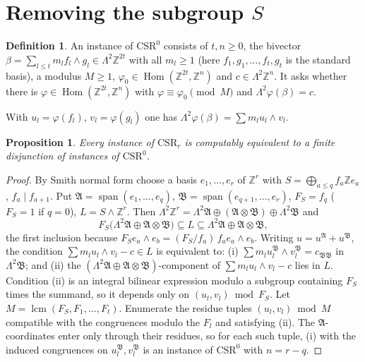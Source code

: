 \documentclass[11pt]{amsart}
\newtheorem{proposition}[theorem]{Proposition}
\theoremstyle{definition}
\newtheorem{definition}[theorem]{Definition}
\theoremstyle{remark}
\newcommand{\Z}{\mathbb{Z}}
\newcommand{\w}{\wedge}
\newcommand{\Hom}{\operatorname{Hom}}
\newcommand{\lcm}{\operatorname{lcm}}
\newcommand{\spn}{\operatorname{span}}
\begin{document}
\section{Removing the subgroup \texorpdfstring{$S$}{S}}\label{sec:S}

\begin{definition}
An instance of $\mathrm{CSR}^0$ consists of $t,n\ge0$, the bivector
$\beta=\sum_{l\le t}m_l f_l\w g_l\in\Lambda^2\Z^{2t}$ with all $m_l\ge1$ (here
$f_1,g_1,\dots,f_t,g_t$ is the standard basis), a modulus $M\ge1$,
$\varphi_0\in\Hom(\Z^{2t},\Z^n)$ and $c\in\Lambda^2\Z^n$. It asks whether there is
$\varphi\in\Hom(\Z^{2t},\Z^n)$ with $\varphi\equiv\varphi_0\pmod M$ and
$\Lambda^2\varphi(\beta)=c$.
\end{definition}

With $u_l=\varphi(f_l)$, $v_l=\varphi(g_l)$ one has
$\Lambda^2\varphi(\beta)=\sum m_lu_l\w v_l$.

\begin{proposition}\label{prop:removeS}
Every instance of $\mathrm{CSR}_r$ is computably equivalent to a finite disjunction
of instances of $\mathrm{CSR}^0$.
\end{proposition}

\begin{proof}
By Smith normal form choose a basis $e_1,\dots,e_r$ of $\Z^r$ with
$S=\bigoplus_{a\le q}f_a\Z e_a$, $f_a\mid f_{a+1}$. Put
$\mathfrak A=\spn(e_1,\dots,e_q)$, $\mathfrak B=\spn(e_{q+1},\dots,e_r)$, $F_S=f_q$
($F_S=1$ if $q=0$), $L=S\w\Z^r$. Then
$\Lambda^2\Z^r=\Lambda^2\mathfrak A\oplus(\mathfrak A\otimes\mathfrak B)\oplus\Lambda^2\mathfrak B$
and
\[F_S\big(\Lambda^2\mathfrak A\oplus\mathfrak A\otimes\mathfrak B\big)\subseteq L\subseteq
\Lambda^2\mathfrak A\oplus\mathfrak A\otimes\mathfrak B,\]
the first inclusion because $F_Se_a\w e_b=(F_S/f_a)\,f_ae_a\w e_b$. Writing
$u=u^{\mathfrak A}+u^{\mathfrak B}$, the condition
$\sum m_lu_l\w v_l-c\in L$ is equivalent to: (i)
$\sum m_lu_l^{\mathfrak B}\w v_l^{\mathfrak B}=c_{\mathfrak B\mathfrak B}$ in
$\Lambda^2\mathfrak B$; and (ii) the $(\Lambda^2\mathfrak A\oplus\mathfrak A\otimes
\mathfrak B)$-component of $\sum m_lu_l\w v_l-c$ lies in $L$. Condition (ii) is an
integral bilinear expression modulo a subgroup containing $F_S$ times the summand,
so it depends only on $(u_l,v_l)\bmod F_S$. Let $M=\lcm(F_S,F_1,\dots,F_t)$. Enumerate
the residue tuples $(u_l,v_l)\bmod M$ compatible with the congruences modulo the
$F_l$ and satisfying (ii). The $\mathfrak A$-coordinates enter only through their
residues, so for each such tuple, (i) with the induced congruences on
$u_l^{\mathfrak B},v_l^{\mathfrak B}$ is an instance of $\mathrm{CSR}^0$ with
$n=r-q$.
\end{proof}
\end{document}
